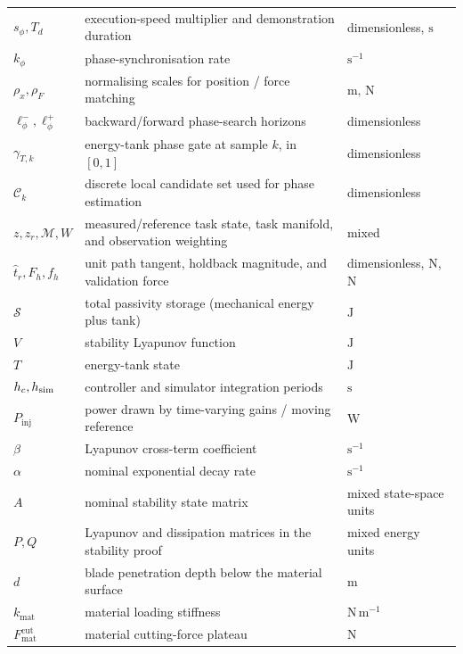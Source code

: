\documentclass[11pt,a4paper]{article}
\begin{document}
\begin{longtable}{p{3.4cm} p{8.1cm} p{2.6cm}}
$s_\phi,T_d$ & execution-speed multiplier and demonstration duration & dimensionless, $\mathrm{s}$ \\
$k_\phi$ & phase-synchronisation rate & $\mathrm{s^{-1}}$ \\
$\rho_x,\rho_F$ & normalising scales for position / force matching & $\mathrm{m},\,\mathrm{N}$ \\
$\ell_\phi^-,\ell_\phi^+$ & backward/forward phase-search horizons & dimensionless \\
$\gamma_{T,k}$ & energy-tank phase gate at sample $k$, in $[0,1]$ & dimensionless \\
$\mathcal C_k$ & discrete local candidate set used for phase estimation & dimensionless \\
$z,z_r,\mathcal M,W$ & measured/reference task state, task manifold, and observation weighting & mixed \\
$\hat t_r,F_h,f_h$ & unit path tangent, holdback magnitude, and validation force & dimensionless, $\mathrm{N}$, $\mathrm{N}$ \\
$\mathcal S$ & total passivity storage (mechanical energy plus tank) & $\mathrm{J}$ \\
$V$ & stability Lyapunov function & $\mathrm{J}$ \\
$T$ & energy-tank state & $\mathrm{J}$ \\
$h_c,h_{\rm sim}$ & controller and simulator integration periods & $\mathrm{s}$ \\
$P_{\text{inj}}$ & power drawn by time-varying gains / moving reference & $\mathrm{W}$ \\
$\beta$ & Lyapunov cross-term coefficient & $\mathrm{s^{-1}}$ \\
$\alpha$ & nominal exponential decay rate & $\mathrm{s^{-1}}$ \\
$A$ & nominal stability state matrix & mixed state-space units \\
$P,Q$ & Lyapunov and dissipation matrices in the stability proof & mixed energy units \\
$d$ & blade penetration depth below the material surface & $\mathrm{m}$ \\
$k_{\text{mat}}$ & material loading stiffness & $\mathrm{N\,m^{-1}}$ \\
$F^{\text{cut}}_{\text{mat}}$ & material cutting-force plateau & $\mathrm{N}$ \\
\bottomrule
\end{longtable}

\end{document}
